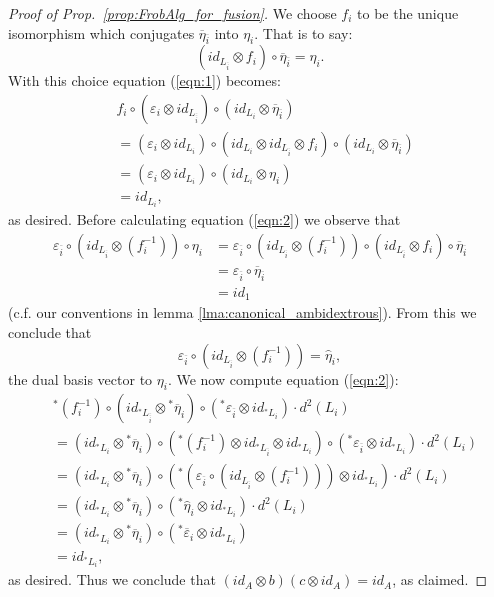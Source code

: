 \documentclass{amsart}
\begin{document}
\begin{proof}[Proof of Prop.~\ref{prop:FrobAlg_for_fusion}]
We choose $f_i$ to be the unique isomorphism which conjugates $\overline{\eta}_{\overline{i}}$ into $\eta_i$. That is to say:
\begin{equation*}
	(id_{L_{\overline{i}}} \otimes f_i) \circ \overline{\eta}_{\overline{i}} = \eta_i.
\end{equation*}
With this choice equation (\ref{eqn:1}) becomes:
\begin{align*}
	& f_i \circ (\varepsilon_i \otimes id_{L_{\overline{\overline{i}}}}) \circ (id_{L_i} \otimes \overline{\eta}_{\overline{i}} ) \\
	& = (\varepsilon_i \otimes id_{L_{{{i}}}}) \circ (id_{L_i} \otimes id_{L_{\overline{i}}} \otimes f_i) \circ (id_{L_i} \otimes \overline{\eta}_{\overline{i}} )\\
	& = (\varepsilon_i \otimes id_{L_{{{i}}}}) \circ (id_{L_i} \otimes {\eta}_{{i}} ) \\
	& = id_{L_i},
\end{align*}
as desired. Before calculating equation (\ref{eqn:2}) we observe that
\begin{align*}
	\varepsilon_{\overline{i}} \circ (id_{L_{\overline{i}}}  \otimes (f_i^{-1})) \circ \eta_i 
	& = \varepsilon_{\overline{i}} \circ (id_{L_{\overline{i}}}  \otimes (f_i^{-1})) \circ (id_{L_{\overline{i}}} \otimes f_i) \circ \overline{\eta}_{\overline{i}}  \\
	& = \varepsilon_{\overline{i}} \circ \overline{\eta}_{\overline{i}} \\
	& = id_1
\end{align*}
(c.f. our conventions in lemma \ref{lma:canonical_ambidextrous}). From this we conclude that 
\begin{equation*}
	\varepsilon_{\overline{i}} \circ (id_{L_{\overline{i}}}  \otimes (f_i^{-1})) = \hat{\eta}_i,
\end{equation*}
the dual basis vector to $\eta_i$. We now compute equation (\ref{eqn:2}):
\begin{align*}
	& {}^*(f_i^{-1}) \circ (id_{{}^* L_{\overline{\overline{i}}}} \otimes {}^* \overline{\eta}_i) \circ ( {}^*\varepsilon_{\overline{i}} \otimes id_{{}^*L_i} )   \cdot d^2(L_i) \\
	& = (id_{{}^* L_{{{i}}}} \otimes {}^* \overline{\eta}_i) \circ ( {}^*(f_i^{-1}) \otimes id_{{}^*L_{\overline{i}}} \otimes id_{{}^*L_i}) \circ ( {}^*\varepsilon_{\overline{i}} \otimes id_{{}^*L_i} )   \cdot d^2(L_i) \\
	& = (id_{{}^* L_{{{i}}}} \otimes {}^* \overline{\eta}_i) \circ ( {}^*(\varepsilon_{\overline{i}} \circ
	 (id_{L_{\overline{i}}}  \otimes (f_i^{-1}))  ) \otimes id_{{}^*L_i} ) \cdot d^2(L_i) \\
	&= (id_{{}^* L_{{{i}}}} \otimes {}^* \overline{\eta}_i) \circ
	 ({}^* \hat{\eta}_i  \otimes id_{{}^*L_i} ) \cdot d^2(L_i)  \\
	& = (id_{{}^* L_{{{i}}}} \otimes {}^* \overline{\eta}_i) \circ 
	({}^* \overline{\varepsilon}_i  \otimes id_{{}^*L_i} ) \\
	&= id_{{}^* L_i}, 
\end{align*}
as desired. Thus we conclude that  $(id_A \otimes b) (c \otimes id_A)  = id_A$, as claimed.
\end{proof}
\end{document}
